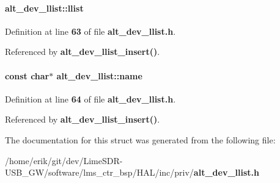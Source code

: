\paragraph[{llist}]{ alt\+\_\+dev\+\_\+llist\+::llist}\label{structalt__dev__llist_a65293b6e20ebdd7a3c3a661037c8aec2}


Definition at line {\bf 63} of file {\bf alt\+\_\+dev\+\_\+llist.\+h}.



Referenced by {\bf alt\+\_\+dev\+\_\+llist\+\_\+insert()}.

\paragraph[{name}]{\setlength{\rightskip}{0pt plus 5cm}const char$\ast$ alt\+\_\+dev\+\_\+llist\+::name}\label{structalt__dev__llist_a17aabf010e65cb65c43ad3d804b2aa52}


Definition at line {\bf 64} of file {\bf alt\+\_\+dev\+\_\+llist.\+h}.



Referenced by {\bf alt\+\_\+dev\+\_\+llist\+\_\+insert()}.



The documentation for this struct was generated from the following file\+:\begin{DoxyCompactItemize}
\item 
/home/erik/git/dev/\+Lime\+S\+D\+R-\/\+U\+S\+B\+\_\+\+G\+W/software/lms\+\_\+ctr\+\_\+bsp/\+H\+A\+L/inc/priv/{\bf alt\+\_\+dev\+\_\+llist.\+h}\end{DoxyCompactItemize}

